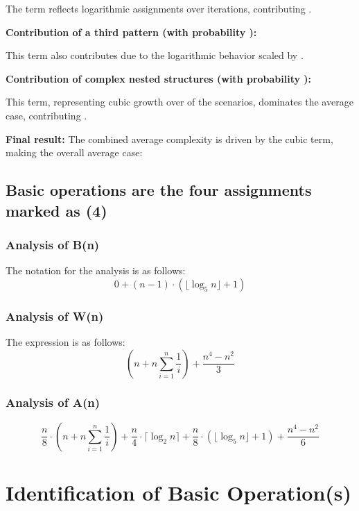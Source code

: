 \documentclass[11pt, oneside, a4paper]{article}
\begin{document}
The term  reflects logarithmic assignments over  iterations, contributing .

\textbf{Contribution of a third pattern (with probability ):}

This term also contributes  due to the logarithmic behavior scaled by .

\textbf{Contribution of complex nested structures (with probability ):}

This term, representing cubic growth over  of the scenarios, dominates the average case, contributing .

\textbf{Final result:} The combined average complexity is driven by the cubic term, making the overall average case:


	\subsection{Basic operations are the four assignments marked as (4)}

	\subsubsection{Analysis of B(n)}
 \noindent The notation for the analysis is as follows:
\begin{equation*}
0 + (n-1) \cdot \left( \lfloor \log_5 n \rfloor + 1 \right)
\end{equation*}

	\subsubsection{Analysis of W(n)}
 \noindent The expression is as follows:
\begin{equation*}
\left( n + n \sum_{i=1}^{n} \frac{1}{i} \right) + \frac{n^4 - n^2}{3}
\end{equation*}

	
        \subsubsection{Analysis of A(n)}
        \begin{equation*}
\frac{n}{8} \cdot ( n + n \sum_{i=1}^{n} \frac{1}{i} ) + \frac{n}{4} \cdot \lceil \log_2 n \rceil + \frac{n}{8} \cdot \left( \lfloor \log_5 n \rfloor + 1 \right) + \frac{n^4 - n^2}{6}
\end{equation*}

	\section{Identification of Basic Operation(s)}
\end{document}
